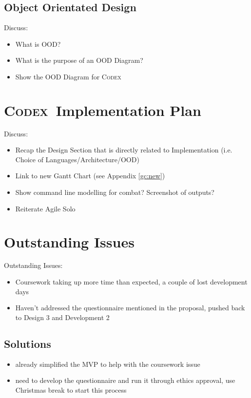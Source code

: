 \documentclass[progress]{cmpreport}
\newcommand{\Codex}{\textsc{Codex}}
\begin{document}
		\subsection{Object Orientated Design}
		Discuss:
		\begin{itemize}
			\item What is OOD?
			\item What is the purpose of an OOD Diagram?
			\item Show the OOD Diagram for \Codex
		\end{itemize}
	
	\section{\Codex \ Implementation Plan}
	Discuss:
	\begin{itemize}
		\item Recap the Design Section that is directly related to Implementation (i.e. Choice of Languages/Architecture/OOD)
		\item Link to new Gantt Chart (see Appendix \ref{gc:new})
		\item Show command line modelling for combat? Screenshot of outputs?
		\item Reiterate Agile Solo
	\end{itemize}
	
	\section{Outstanding Issues} \label{sec:Issues}
	Outstanding Issues:
	\begin{itemize}
		\item Coursework taking up more time than expected, a couple of lost development days
		\item Haven't addressed the questionnaire mentioned in the proposal, pushed back to Design 3 and Development 2
	\end{itemize}
		\subsection{Solutions}
		\begin{itemize}
			\item already simplified the MVP to help with the coursework issue
			\item need to develop the questionnaire and run it through ethics approval, use Christmas break to start this process
		\end{itemize}
\end{document}
